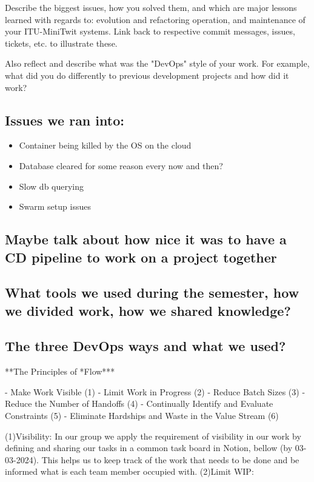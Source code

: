 \documentclass{article}
\begin{document}
Describe the biggest issues, how you solved them, and which are major lessons learned with regards to: evolution and refactoring operation, and maintenance of your ITU-MiniTwit systems. Link back to respective commit messages, issues, tickets, etc. to illustrate these.

Also reflect and describe what was the "DevOps" style of your work. For example, what did you do differently to previous development projects and how did it work?

\subsection{Issues we ran into:}

\begin{itemize}
  \item Container being killed by the OS on the cloud
  \item Database cleared for some reason every now and then?
  \item Slow db querying
  \item Swarm setup issues
\end{itemize}

\subsection{Maybe talk about how nice it was to have a CD pipeline to work on a project together}

\subsection{What tools we used during the semester, how we divided work, how we shared knowledge?}

\subsection{The three DevOps ways and what we used?}

**The Principles of *Flow***

- Make Work Visible (1)
- Limit Work in Progress (2)
- Reduce Batch Sizes (3)
- Reduce the Number of Handoffs (4)
- Continually Identify and Evaluate Constraints (5)
- Eliminate Hardships and Waste in the Value Stream (6)

(1)Visibility:  In our group we apply the requirement of visibility in our work by defining and sharing our tasks in a common task board in Notion, bellow (by 03-03-2024). This helps us to keep track of the work that needs to be done and be informed what is each team member occupied with.
(2)Limit WIP:
\end{document}
